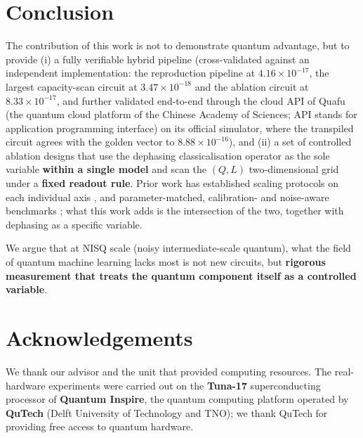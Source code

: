 \documentclass{article}
\begin{document}
\section{Conclusion}

The contribution of this work is not to demonstrate quantum advantage,
but to provide (i) a fully verifiable hybrid pipeline (cross-validated
against an independent implementation: the reproduction pipeline at
\(4.16 \times 10^{- 17}\), the largest capacity-scan circuit at
\(3.47 \times 10^{- 18}\) and the ablation circuit at
\(8.33 \times 10^{- 17}\), and further validated end-to-end through the
cloud API of Quafu (the quantum cloud platform of the Chinese Academy of
Sciences; API stands for application programming interface) on its
official simulator, where the transpiled circuit agrees with the golden
vector to \(8.88 \times 10^{- 16}\)), and (ii) a set of controlled
ablation designs that use the dephasing classicalisation operator as the
sole variable \textbf{within a single model} and scan the \((Q,L)\)
two-dimensional grid under a \textbf{fixed readout rule}. Prior work has
established scaling protocols on each individual axis
\cite{vyskubov2026}, and parameter-matched, calibration- and noise-aware
benchmarks \cite{gillani2026}; what this work adds is the intersection of
the two, together with dephasing as a specific variable.

We argue that at NISQ scale (noisy intermediate-scale quantum), what the
field of quantum machine learning lacks most is not new circuits, but
\textbf{rigorous measurement that treats the quantum component itself as
a controlled variable}.

\section{Acknowledgements}

We thank our advisor and the unit that provided computing resources. The
real-hardware experiments were carried out on the \textbf{Tuna-17}
superconducting processor of \textbf{Quantum Inspire}, the quantum
computing platform operated by \textbf{QuTech} (Delft University of
Technology and TNO); we thank QuTech for providing free access to
quantum hardware.


\end{document}
